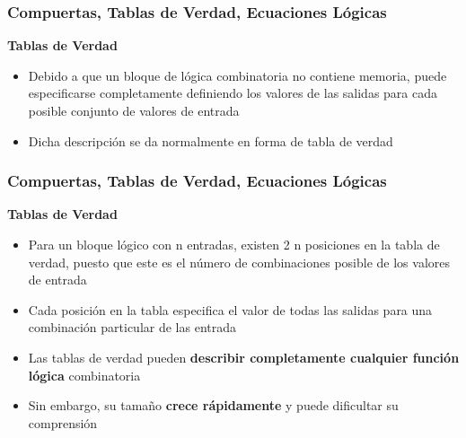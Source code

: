 \documentclass[aspectratio=169,compress]{beamer}
\begin{document}
\begin{footnotesize}
\begin{frame}
\frametitle{Compuertas, Tablas de Verdad, Ecuaciones Lógicas}
\begin{center}\textbf{Tablas de Verdad}\end{center}
\begin{itemize}
\item Debido a que un bloque de lógica combinatoria 
no contiene memoria, puede especificarse 
completamente definiendo los valores de las 
salidas para cada posible conjunto de valores 
de entrada
\item 
Dicha descripción se da normalmente en forma 
de 
tabla de verdad

\end{itemize}
\end{frame}




\begin{frame}
\frametitle{Compuertas, Tablas de Verdad, Ecuaciones Lógicas}
\begin{center}\textbf{Tablas de Verdad}\end{center}
\begin{itemize}
\item Para un bloque lógico con n entradas, existen   2 n posiciones en la tabla de verdad, puesto que 
este es el número de combinaciones posible de 
los valores de entrada
\item Cada posición en la tabla especifica el valor de 
todas las salidas para una combinación 
particular de las entrada
\item Las tablas de verdad pueden \textbf{describir 
completamente cualquier función lógica} 
combinatoria
\item Sin embargo, su tamaño \textbf{crece rápidamente} y 
puede dificultar su comprensión

\end{itemize}
\end{frame}


%
%












\end{footnotesize}
\end{document}
